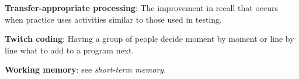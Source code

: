 \textbf{\hypertarget{g:transfer-appropriate-processing}{Transfer-appropriate processing}\label{g:transfer-appropriate-processing}}:
The improvement in recall that occurs when practice uses activities
similar to those used in testing.

\textbf{\hypertarget{g:twitch-coding}{Twitch coding}\label{g:twitch-coding}}: Having a group of people
decide moment by moment or line by line what to add to a program next.

\textbf{\hypertarget{g:working-memory}{Working memory}\label{g:working-memory}}: see \emph{short-term memory}.
